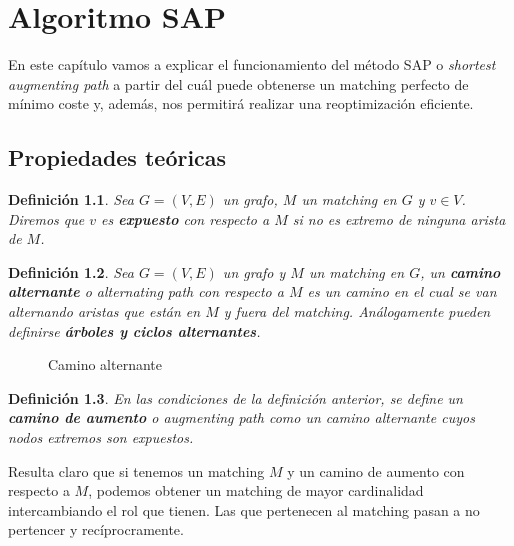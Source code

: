 \documentclass[twoside,a4paper,openright,12pt,tikz]{book}
\newtheorem{defi}{Definici\'on}[section]
\begin{document}
\chapter{Algoritmo SAP}
En este capítulo vamos a explicar el funcionamiento del método SAP o \textit{shortest augmenting path} a partir del cuál puede obtenerse un matching perfecto de mínimo coste y, además, nos permitirá realizar una reoptimización eficiente.
\section{Propiedades teóricas}
\begin{defi}
Sea $G=(V,E)$ un grafo, $M$ un matching en $G$ y $v\in V$. Diremos que $v$ es \textbf{expuesto} con respecto a $M$ si no es extremo de ninguna arista de $M$.
\end{defi}
\begin{defi}
Sea $G=(V,E)$ un grafo y $M$ un matching en $G$, un \textbf{camino alternante} o \textit{alternating path} con respecto a $M$ es un camino en el cual se van alternando aristas que están en $M$ y fuera del matching. Análogamente pueden definirse \textbf{árboles y ciclos alternantes}.
\end{defi}
\begin{figure}[h!]
\centering
{}
\caption{Camino alternante}
\end{figure}

\begin{defi}
En las condiciones de la definición anterior, se define un \textbf{camino de aumento} o \textit{augmenting path} como un camino alternante cuyos nodos extremos son expuestos.
\end{defi}
Resulta claro que si tenemos un matching $M$ y un camino de aumento con respecto a $M$, podemos obtener un matching de mayor cardinalidad intercambiando el rol que tienen. Las que pertenecen al matching pasan a no pertencer y recíprocramente.
\end{document}
